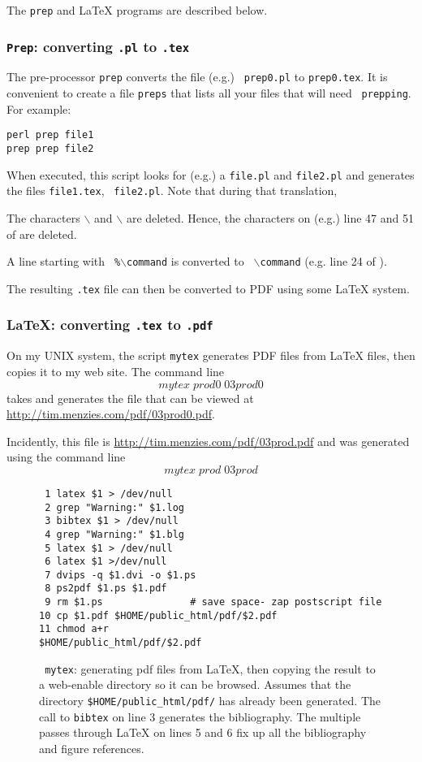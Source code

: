 The {\tt prep} and {\LaTeX} programs are described below.

\subsubsection{{\tt Prep}: converting {\tt *.pl} to {\tt *.tex}}

The pre-processor {\tt prep} converts the file (e.g.) {\tt
prep0.pl} to {\tt prep0.tex}. It is convenient to create a file
{\tt preps} that lists all your files that will need {\tt
prepping}. For example:

{\scriptsize\begin{verbatim}
perl prep file1
prep prep file2
\end{verbatim}}

When executed, this script looks for (e.g.) a {\tt file.pl} and
{\tt file2.pl} and generates  the files {\tt file1.tex}, {\tt
file2.pl}. Note that during that translation,  \bi \item The
characters {$\backslash$}{\tt *} and {\tt *}{$\backslash$} are
deleted. Hence, the characters on (e.g.) line 47 and 51 of
 are deleted.   \item A line starting with {\tt
\%{$\backslash$}command} is converted to {\tt
{$\backslash$}command} (e.g. line 24 of ). \ei

The resulting  {\tt *.tex} file can then be converted to PDF using
some {\LaTeX} system.

\subsubsection{{\LaTeX}: converting {\tt *.tex} to {\tt *.pdf}}

On my UNIX system, the script {\tt mytex}  generates PDF files
from {\LaTeX} files, then copies it to my web site. The command
line
\[
mytex\; prod0\; 03prod0
\]
takes  and generates the file that can be viewed
at \url{http://tim.menzies.com/pdf/03prod0.pdf}.

Incidently, this file is
\url{http://tim.menzies.com/pdf/03prod.pdf} and was generated
using the command line
\[
mytex\; prod\; 03prod
\]

\begin{figure}
{\scriptsize \begin{verbatim}
 1 latex $1 > /dev/null
 2 grep "Warning:" $1.log
 3 bibtex $1 > /dev/null
 4 grep "Warning:" $1.blg
 5 latex $1 > /dev/null
 6 latex $1 >/dev/null
 7 dvips -q $1.dvi -o $1.ps
 8 ps2pdf $1.ps $1.pdf
 9 rm $1.ps               # save space- zap postscript file
10 cp $1.pdf $HOME/public_html/pdf/$2.pdf
11 chmod a+r
$HOME/public_html/pdf/$2.pdf
\end{verbatim}}
\caption[{\tt mytex}: generating pdf files from {\LaTeX}]{{\tt
mytex}: generating pdf files from {\LaTeX}, then copying the
result to a web-enable directory so it can be browsed. Assumes
that the directory {\tt \$HOME/public_html/pdf/} has already been
generated. The call to {\tt bibtex} on line 3 generates the
bibliography. The multiple passes through {\LaTeX} on lines 5 and
6 fix up all the bibliography and figure
references.}\label{fig:mytex}
\end{figure}

